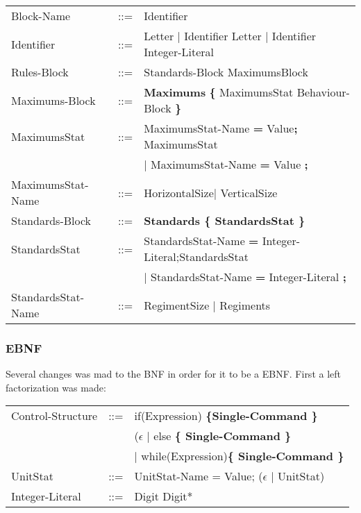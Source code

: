 \begin{tabular}{ l l l }
			Block-Name		   &	::=  & Identifier							\\
			Identifier		   &    ::=  & Letter $\mid$ Identifier Letter $\mid$ Identifier Integer-Literal \\
			Rules-Block		   &	::=	 & Standards-Block MaximumsBlock 				\\
			Maximums-Block	   &	::=	 & {\bf Maximums} {\bf \{} MaximumsStat Behaviour-Block {\bf \}}	\\
			MaximumsStat	   &	::=  & MaximumsStat-Name {\bf = } Value{\bf ;} MaximumsStat  			\\
							   &		 & $\mid$ MaximumsStat-Name {\bf = } Value {\bf ; }	 			 \\
			MaximumsStat-Name  &	::=  & HorizontalSize$\mid$ VerticalSize							\\
			Standards-Block	   &    ::=  & \bf{Standards} {\bf \{ } StandardsStat \bf{\} }					\\
			StandardsStat	   & 	::=	 & StandardsStat-Name {\bf = } Integer-Literal;StandardsStat 				\\
							   &		 & $\mid$ StandardsStat-Name {\bf = } Integer-Literal {\bf ; } 		\\
			StandardsStat-Name & 	::=	 & RegimentSize	$\mid$ Regiments									 \\
		\end{tabular}
		
	\subsubsection{EBNF}
		Several changes was mad to the BNF in order for it to be a EBNF. First a left factorization was made:
		\begin{tabular}{ l l l }
			Control-Structure  &  	::=  & if(Expression) \bf{\{}Single-Command \bf{\}}  \\
							   &  	     & ($\epsilon$ $\mid$ else \bf{\{ }Single-Command \bf{\} } \\					   
							   &   		 & $\mid$ while(Expression)\bf{\{ } Single-Command \bf{\}} \\
	  		UnitStat		   &	::=  & UnitStat-Name = Value; ($\epsilon$ $\mid$ UnitStat) \\
			Integer-Literal    &	::=  & Digit Digit* 
			
								
		\end{tabular}
							   
							   